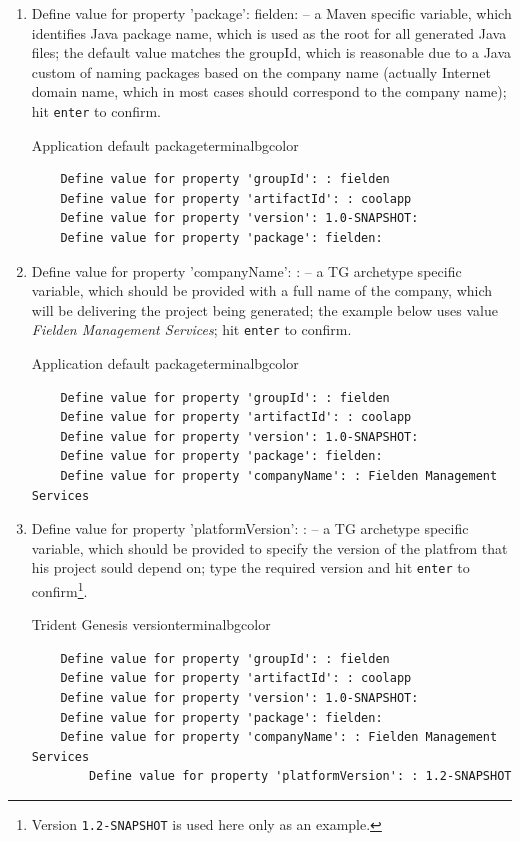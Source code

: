 \begin{enumerate}
    \item Define value for property 'package': fielden: -- a Maven specific variable, which identifies Java package name, which is used as the root for all generated Java files; the default value matches the groupId, which is reasonable due to a Java custom of naming packages based on the company name (actually Internet domain name, which in most cases should correspond to the company name); hit \texttt{enter} to confirm.
    
    \begin{code}{Application default package}{\label{lst::archetype-package}}{terminalbgcolor}
      \begin{lstlisting}
	Define value for property 'groupId': : fielden		
	Define value for property 'artifactId': : coolapp
	Define value for property 'version': 1.0-SNAPSHOT:
	Define value for property 'package': fielden:
      \end{lstlisting}
    \end{code}

    \item Define value for property 'companyName': : -- a TG archetype specific variable, which should be provided with a full name of the company, which will be delivering the project being generated; the example below uses value \emph{Fielden Management Services}; hit \texttt{enter} to confirm.
    
    \begin{code}{Application default package}{\label{lst::archetype-package}}{terminalbgcolor}
      \begin{lstlisting}
	Define value for property 'groupId': : fielden		
	Define value for property 'artifactId': : coolapp
	Define value for property 'version': 1.0-SNAPSHOT:
	Define value for property 'package': fielden:
	Define value for property 'companyName': : Fielden Management Services
      \end{lstlisting}
    \end{code}

    \item Define value for property 'platformVersion': : -- a TG archetype specific variable, which should be provided to specify the version of the platfrom that his project sould depend on; type the required version and hit \texttt{enter} to confirm\footnote{Version \texttt{1.2-SNAPSHOT} is used here only as an example.}.    
    \begin{code}{Trident Genesis version}{\label{lst::archetype-platformVerson}}{terminalbgcolor}
      \begin{lstlisting}
	Define value for property 'groupId': : fielden		
	Define value for property 'artifactId': : coolapp
	Define value for property 'version': 1.0-SNAPSHOT:
	Define value for property 'package': fielden:	
	Define value for property 'companyName': : Fielden Management Services
        Define value for property 'platformVersion': : 1.2-SNAPSHOT
      \end{lstlisting}
    \end{code}
    

\end{enumerate}
